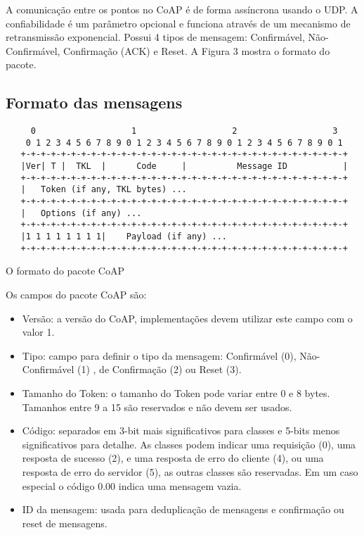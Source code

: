 A comunica\c{c}\~ao entre os pontos no CoAP \'e de forma ass\'incrona usando o UDP. A confiabilidade \'e um par\^ametro opcional e funciona atrav\'es de um mecanismo de retransmiss\~ao exponencial. Possui 4 tipos de mensagem: Confirm\'avel, N\~ao-Confirm\'avel, Confirma\c{c}\~ao (ACK) e Reset. A Figura 3 mostra o formato do pacote.

\subsection{Formato das mensagens}
\begin{verbatim}
     0                   1                   2                   3
    0 1 2 3 4 5 6 7 8 9 0 1 2 3 4 5 6 7 8 9 0 1 2 3 4 5 6 7 8 9 0 1
   +-+-+-+-+-+-+-+-+-+-+-+-+-+-+-+-+-+-+-+-+-+-+-+-+-+-+-+-+-+-+-+-+
   |Ver| T |  TKL  |      Code     |          Message ID           |
   +-+-+-+-+-+-+-+-+-+-+-+-+-+-+-+-+-+-+-+-+-+-+-+-+-+-+-+-+-+-+-+-+
   |   Token (if any, TKL bytes) ...
   +-+-+-+-+-+-+-+-+-+-+-+-+-+-+-+-+-+-+-+-+-+-+-+-+-+-+-+-+-+-+-+-+
   |   Options (if any) ...
   +-+-+-+-+-+-+-+-+-+-+-+-+-+-+-+-+-+-+-+-+-+-+-+-+-+-+-+-+-+-+-+-+
   |1 1 1 1 1 1 1 1|    Payload (if any) ...
   +-+-+-+-+-+-+-+-+-+-+-+-+-+-+-+-+-+-+-+-+-+-+-+-+-+-+-+-+-+-+-+-+
\end{verbatim}
O formato do pacote CoAP  \cite{draft-ietf-core-coap-18}


Os campos do pacote CoAP s\~ao:
\begin{itemize}
    \item Vers\~ao: a vers\~ao do CoAP, implementa\c{c}\~oes devem utilizar este campo com o valor 1.
    \item Tipo: campo para definir o tipo da mensagem: Confirm\'avel (0), N\~ao-Confirm\'avel (1) , de Confirma\c{c}\~ao (2) ou Reset (3).
    \item Tamanho do Token: o tamanho do Token pode variar entre 0 e 8 bytes. Tamanhos entre 9 a 15 s\~ao reservados e n\~ao devem ser usados.
    \item C\'odigo: separados em 3-bit mais significativos para classes e 5-bits menos significativos para detalhe. As classes podem indicar uma requisi\c{c}\~ao (0), uma resposta de sucesso (2), e uma resposta de erro do cliente (4), ou uma resposta de erro do servidor (5), as outras classes s\~ao reservadas. Em um caso especial o c\'odigo 0.00 indica uma mensagem vazia.
    \item ID da mensagem: usada para deduplica\c{c}\~ao de mensagens e confirma\c{c}\~ao ou reset de mensagens.
\end{itemize}

